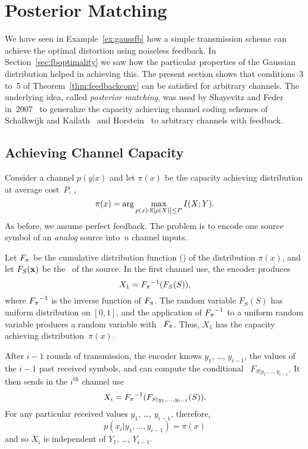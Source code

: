 \section{Posterior Matching}

We have seen in Example~\ref{ex:gaussfb} how a simple transmission scheme can
achieve the optimal distortion using noiseless feedback. In
Section~\ref{sec:fboptimality} we saw how the particular properties of the
Gaussian distribution helped in achieving this. The present section shows that
conditions~3 to~5 of Theorem~\ref{thm:feedbackconv} can be satisfied for
arbitrary channels. The underlying idea, called \emph{posterior matching}, was
used by Shayevitz and Feder in~2007~\cite{ShayevitzF2007,ShayevitzF2008} to
generalize the capacity achieving channel coding schemes of Schalkwijk and
Kailath~\cite{SchalkwijkK1966} and Horstein~\cite{Horstein1963} to arbitrary
channels with feedback.


\subsection{Achieving Channel Capacity}

Consider a channel $p(y|x)$ and let $\pi(x)$ be the capacity achieving
distribution at average cost~$P$, \ie, 
\begin{equation*}
  \pi(x) = \arg\max_{p(x): \mathbb{E}[\rho(X)] \le P} I(X;Y).
\end{equation*}
As before, we assume perfect feedback. The problem is to encode one source
symbol of an \emph{analog} source into~$n$ channel inputs. 

Let ${F_{\pi}}$ be the cumulative distribution function (\cdf) of the distribution
$\pi(x)$, and let $F_S(\mathbf{x})$ be the \cdf\ of the source. In the first channel
use, the encoder produces
\begin{equation*}
  X_1 = {F_{\pi}}^{-1}(F_S(S)),
\end{equation*}
where ${F_{\pi}}^{-1}$ is the inverse function of ${F_{\pi}}$. The random variable
$F_S(S)$ has uniform distribution on $[0,1]$, and the application of ${F_{\pi}}^{-1}$
to a uniform random variable produces a random variable with \cdf\ ${F_{\pi}}$. Thus,
$X_1$ has the capacity achieving distribution~$\pi(x)$. 

After $i-1$ rounds of transmission, the encoder knows $y_1$, \ldots, $y_{i-1}$,
the values of the $i-1$ past received symbols, and can compute the conditional
\cdf\ $F_{S|y_1, \ldots, y_{i-1}}$. It then sends in the $i^{\text{th}}$ channel
use
\begin{equation}
  \label{eq:posteriorxi}
  X_i = {F_{\pi}}^{-1}(F_{S|y_1,\dots,y_{i-1}}(S)).
\end{equation}
For any particular received values $y_1$, \ldots, $y_{i-1}$, therefore,
\begin{equation*}
  p(x_i|y_1, \dots, y_{i-1}) = \pi(x)
\end{equation*}
and so $X_i$ is independent of $Y_1$, \ldots, $Y_{i-1}$. 


